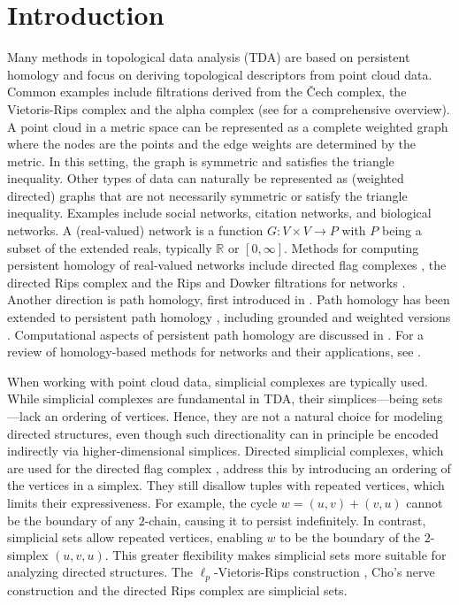 \documentclass[a4paper,11pt]{article}
\theoremstyle{remark}
\begin{document}
\section{Introduction}
Many methods in topological data analysis (TDA) are based on persistent homology and focus on deriving topological descriptors from point cloud data. Common examples include filtrations derived from the \v{C}ech complex, the Vietoris-Rips complex and the alpha complex (see  \cite{chazal2021introduction} for a comprehensive overview). A point cloud in a metric space can be represented as a complete weighted graph where the nodes are the points and the edge weights are determined by the metric. In this setting, the graph is symmetric and satisfies the triangle inequality. Other types of data can naturally be represented as (weighted directed) graphs that are not necessarily symmetric or satisfy the triangle inequality. Examples include social networks, citation networks, and biological networks. A (real-valued) network is a function $G\colon V\times V\to P$ with $P$ being a subset of the extended reals, typically $\mathbb{R}$ or $[0,\infty]$. Methods for computing persistent homology of real-valued networks include directed flag complexes \cite{reimann2017cliques, lutgehetmann2020computing, caputi2021promises}, the directed Rips complex \cite{turner2019rips,mendez2023directed} and the Rips and Dowker filtrations for networks \cite{chowdhury2018functorial}. Another direction is path homology, first introduced in \cite{grigor2013path}. Path homology has been extended to persistent path homology \cite{chowdhury2018persistent}, including grounded and weighted versions \cite{chaplin2024grounded,lin2019weighted}. Computational aspects of persistent path homology are discussed in \cite{dey2022computational,dey2022efficient}. For a review of homology-based methods for networks and their applications, see \cite{aktas2019persistence}.

When working with point cloud data, simplicial complexes are typically used. While simplicial complexes are fundamental in TDA, their simplices---being sets---lack an ordering of vertices. Hence, they are not a natural choice for modeling directed structures, even though such directionality can in principle be encoded indirectly via higher-dimensional simplices. Directed simplicial complexes, which are used for the directed flag complex \cite{reimann2017cliques}, address this by introducing an ordering of the vertices in a simplex. They still disallow tuples with repeated vertices, which limits their expressiveness. For example, the cycle $w = (u, v) + (v, u)$ cannot be the boundary of any $2$-chain, causing it to persist indefinitely. In contrast, simplicial sets allow repeated vertices, enabling $w$ to be the boundary of the $2$-simplex $(u, v, u)$. This greater flexibility makes simplicial sets more suitable for analyzing directed structures. The $\ell_p$-Vietoris-Rips construction \cite{ivanov2024ell_p}, Cho's nerve construction \cite{cho} and the directed Rips complex \cite{turner2019rips} are simplicial sets.
\end{document}
